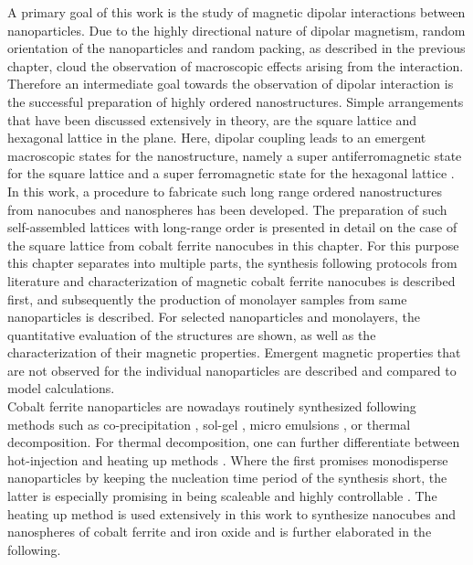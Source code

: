 \documentclass[\main/dresen_thesis.tex]{subfiles}
\begin{document}
  A primary goal of this work is the study of magnetic dipolar interactions between nanoparticles.
  Due to the highly directional nature of dipolar magnetism, random orientation of the nanoparticles and random packing, as described in the previous chapter, cloud the observation of macroscopic effects arising from the interaction.
  Therefore an intermediate goal towards the observation of dipolar interaction is the successful preparation of highly ordered nanostructures.
  Simple arrangements that have been discussed extensively in theory, are the square lattice and hexagonal lattice in the plane.
  Here, dipolar coupling leads to an emergent macroscopic states for the nanostructure, namely a super antiferromagnetic state for the square lattice and a super ferromagnetic state for the hexagonal lattice \cite{Politi_2002_Dipol, Russier_2001_Calcu, Varon_2013_Dipol}.
  In this work, a procedure to fabricate such long range ordered nanostructures from nanocubes and nanospheres has been developed.
  The preparation of such self-assembled lattices with long-range order is presented in detail on the case of the square lattice from cobalt ferrite nanocubes in this chapter.
  For this purpose this chapter separates into multiple parts, the synthesis following protocols from literature and characterization of magnetic cobalt ferrite nanocubes is described first, and subsequently the production of monolayer samples from same nanoparticles is described.
  For selected nanoparticles and monolayers, the quantitative evaluation of the structures are shown, as well as the characterization of their magnetic properties. Emergent magnetic properties that are not observed for the individual nanoparticles are described and compared to model calculations.
  \\

  Cobalt ferrite nanoparticles are nowadays routinely synthesized following methods such as co-precipitation \cite{Fried_2001_Order}, sol-gel \cite{Niederberger_2009_Metal}, micro emulsions \cite{Pillai_1996_Synth}, or thermal decomposition.
  For thermal decomposition, one can further differentiate between hot-injection \cite{Hyeon_2003_Chemi} and heating up methods \cite{Embden_2015_TheHe}.
  Where the first promises monodisperse nanoparticles by keeping the nucleation time period of the synthesis short, the latter is especially promising in being scaleable and highly controllable \cite{Park_2004_Ultra}.
  The heating up method is used extensively in this work to synthesize nanocubes and nanospheres of cobalt ferrite and iron oxide and is further elaborated in the following.
\end{document}
